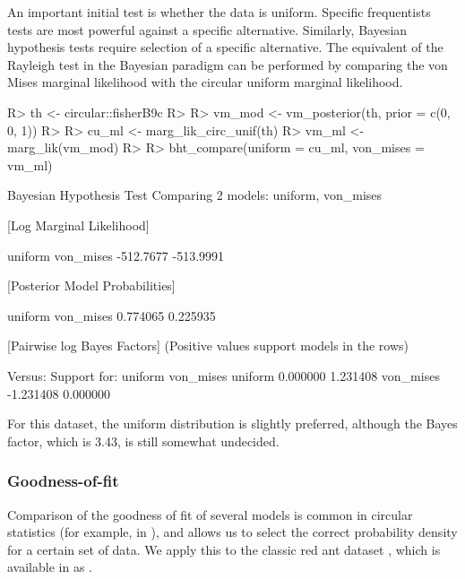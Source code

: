 An important initial test is whether the data is uniform. Specific
frequentists tests are most powerful against a specific alternative.
Similarly, Bayesian hypothesis tests require selection of a specific
alternative. The equivalent of the Rayleigh test
\citep{mardia2009directional, brazier1994confidence} in the Bayesian
paradigm can be performed by comparing the von Mises marginal likelihood
with the circular uniform marginal likelihood.

\begin{CodeChunk}

\begin{CodeInput}
R> th <- circular::fisherB9c
R> 
R> vm_mod <- vm_posterior(th, prior = c(0, 0, 1))
R> 
R> cu_ml  <- marg_lik_circ_unif(th)
R> vm_ml  <- marg_lik(vm_mod)
R> 
R> bht_compare(uniform = cu_ml, von_mises = vm_ml)
\end{CodeInput}

\begin{CodeOutput}
Bayesian Hypothesis Test
    Comparing 2 models: uniform, von_mises

[Log Marginal Likelihood]

  uniform von_mises 
-512.7677 -513.9991 


[Posterior Model Probabilities]

  uniform von_mises 
 0.774065  0.225935 


[Pairwise log Bayes Factors]
  (Positive values support models in the rows)

               Versus: 
Support for:      uniform von_mises
      uniform    0.000000  1.231408
      von_mises -1.231408  0.000000
\end{CodeOutput}
\end{CodeChunk}

For this dataset, the uniform distribution is slightly preferred,
although the Bayes factor, which is 3.43, is still somewhat undecided.

\hypertarget{goodness-of-fit}{%
\subsubsection{Goodness-of-fit}\label{goodness-of-fit}}

Comparison of the goodness of fit of several models is common in
circular statistics (for example, in \citet{pewsey2013circular}), and
allows us to select the correct probability density for a certain set of
data. We apply this to the classic red ant dataset
\citep{jander1957optische, fisher1995statistical}, which is available in
 as .

